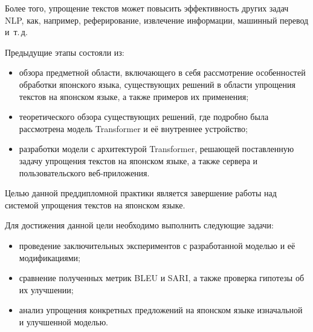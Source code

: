 Более того, упрощение текстов может повысить эффективность других задач NLP, как, например, реферирование, извлечение информации, машинный перевод и~т.\,д.

Предыдущие этапы состояли из:
\begin{itemize}%
  \item обзора предметной области, включающего в себя рассмотрение особенностей обработки японского языка, существующих решений в области упрощения текстов на японском языке, а также примеров их применения;
  \item теоретического обзора существующих решений, где подробно была рассмотрена модель Transformer и её внутреннее устройство;
  \item разработки модели с архитектурой Transformer, решающей поставленную задачу упрощения текстов на японском языке, а также сервера и пользовательского веб-приложения.
\end{itemize}

Целью данной преддипломной практики является завершение работы над системой упрощения текстов на японском языке.

Для достижения данной цели необходимо выполнить следующие задачи:
\begin{itemize}%
  \item проведение заключительных экспериментов с разработанной моделью и её модификациями;
  \item сравнение полученных метрик BLEU и SARI, а также проверка гипотезы об их улучшении;
  \item анализ упрощения конкретных предложений на японском языке изначальной и улучшенной моделью.
\end{itemize}


